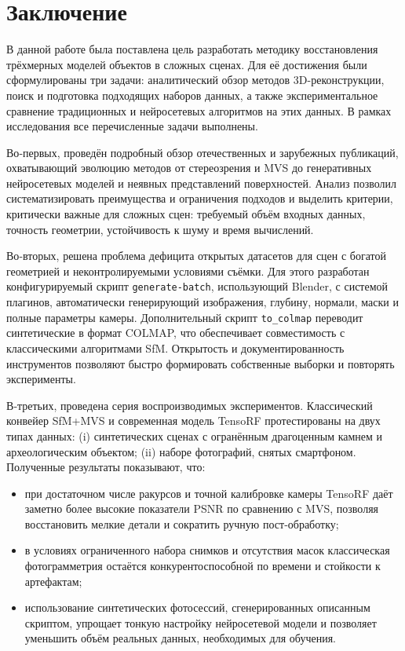 \chapter{Заключение}

В данной работе была поставлена цель разработать методику восстановления
трёхмерных моделей объектов в сложных сценах. Для её
достижения были сформулированы три задачи: аналитический обзор методов
3D-реконструкции, поиск и подготовка подходящих наборов данных, а также
экспериментальное сравнение традиционных и нейросетевых алгоритмов на этих
данных. В рамках исследования все перечисленные задачи выполнены.

Во‑первых, проведён подробный обзор отечественных и зарубежных публикаций,
охватывающий эволюцию методов от стереозрения и MVS до генеративных нейросетевых
моделей и неявных представлений поверхностей. Анализ позволил систематизировать
преимущества и ограничения подходов и выделить критерии, критически важные для
сложных сцен: требуемый объём входных данных, точность геометрии, устойчивость
к шуму и время вычислений.

Во‑вторых, решена проблема дефицита открытых датасетов для сцен с богатой
геометрией и неконтролируемыми условиями съёмки. Для этого разработан
конфигурируемый скрипт \texttt{generate-batch}, использующий Blender, с
системой плагинов, автоматически генерирующий изображения, глубину, нормали,
маски и полные параметры камеры. Дополнительный скрипт \texttt{to\_colmap}
переводит синтетические в формат COLMAP, что обеспечивает совместимость с
классическими алгоритмами SfM. Открытость и документированность инструментов
позволяют быстро формировать собственные выборки и повторять эксперименты.

В‑третьих, проведена серия воспроизводимых экспериментов. Классический конвейер
SfM+MVS и современная модель TensoRF протестированы на двух типах данных: (i)
синтетических сценах с огранённым драгоценным камнем и археологическим
объектом; (ii) наборе фотографий, снятых смартфоном. Полученные результаты
показывают, что:

\begin{itemize}
  \item при достаточном числе ракурсов и точной калибровке камеры TensoRF даёт заметно
  более высокие показатели PSNR по сравнению с MVS, позволяя восстановить
  мелкие детали и сократить ручную пост‑обработку;
  \item в условиях ограниченного набора снимков и отсутствия масок классическая
  фотограмметрия остаётся конкурентоспособной по времени и стойкости
  к артефактам;
  \item использование синтетических фотосессий, сгенерированных описанным скриптом,
  упрощает тонкую настройку нейросетевой модели и позволяет уменьшить объём
  реальных данных, необходимых для обучения.
\end{itemize}

